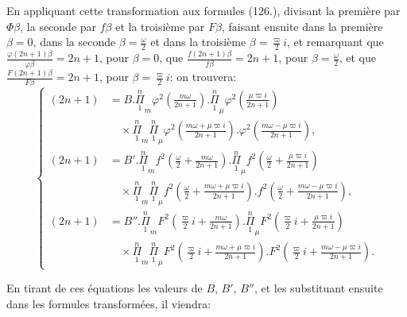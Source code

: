 \documentclass{article}
\begin{document}
En appliquant cette transformation aux formules (126.), divisant la première par $\Phi\beta$, la seconde par $f\beta$ et la troisième par $F\beta$, faisant ensuite dans la première $\beta=0$, dans la seconde $\beta=\frac{\omega}{2}$ et dans la troisième $\beta=\frac{\varpi}{2}i$, et remarquant que $\frac{\varphi(2n+1)\beta}{\varphi\beta}=2n+1$, pour $\beta=0$, que $\frac{f(2n+1)\beta}{f\beta}=2n+1$, pour $\beta=\frac{\omega}{2}$, et que $\frac{F(2n+1)\beta}{F\beta}=2n+1$, pour $\beta=\frac{\varpi}{2}i$: on trouvera:
\[ \left\{\begin{aligned}
(2n+1)&=B.\overset{n}{\underset{1}{\Pi}}_{m}\varphi^{2}\left(\frac{m\omega}{2n+1}\right).\overset{n}{\underset{1}{\Pi}}_{\mu}\varphi^{2}\left(\frac{\mu\varpi i}{2n+1}\right)\\
&\quad\times\overset{n}{\underset{1}{\Pi}}_{m}\overset{n}{\underset{1}{\Pi}}_{\mu}\varphi^{2}\left(\frac{m\omega+\mu\varpi i}{2n+1}\right).\varphi^{2}\left(\frac{m\omega-\mu\varpi i}{2n+1}\right),\\
(2n+1)&=B'.\overset{n}{\underset{1}{\Pi}}_{m}f^{2}\left(\frac{\omega}{2}+\frac{m\omega}{2n+1}\right).\overset{n}{\underset{1}{\Pi}}_{\mu}f^{2}\left(\frac{\omega}{2}+\frac{\mu\varpi i}{2n+1}\right)\\
&\quad\times\overset{n}{\underset{1}{\Pi}}_{m}\overset{n}{\underset{1}{\Pi}}_{\mu}f^{2}\left(\frac{\omega}{2}+\frac{m\omega+\mu\varpi i}{2n+1}\right).f^{2}\left(\frac{\omega}{2}+\frac{m\omega-\mu\varpi i}{2n+1}\right),\\
(2n+1)&=B''.\overset{n}{\underset{1}{\Pi}}_{m}F^{2}\left(\frac{\varpi}{2}i+\frac{m\omega}{2n+1}\right).\overset{n}{\underset{1}{\Pi}}_{\mu}F^{2}\left(\frac{\varpi}{2}i+\frac{\mu\varpi i}{2n+1}\right)\\
&\quad\times\overset{n}{\underset{1}{\Pi}}_{m}\overset{n}{\underset{1}{\Pi}}_{\mu}F^{2}\left(\frac{\varpi}{2}i+\frac{m\omega+\mu\varpi i}{2n+1}\right).F^{2}\left(\frac{\varpi}{2}i+\frac{m\omega-\mu\varpi i}{2n+1}\right).
\end{aligned}\right. \tag{128.} \]

En tirant de ces équations les valeurs de $B$, $B'$, $B''$, et les substituant ensuite dans les formules transformées, il viendra:
\end{document}
